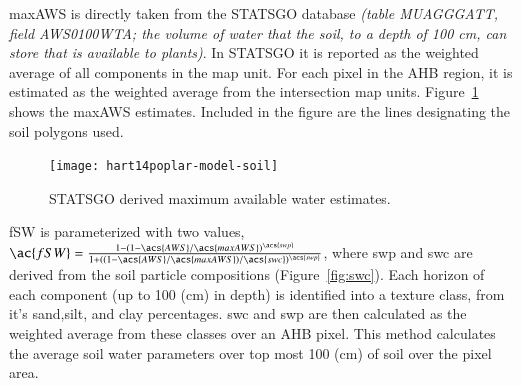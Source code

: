 \documentclass[preprint,12pt]{elsarticle}
\begin{document}
\ac{maxAWS} is directly taken from the \ac{STATSGO} database
\textit{(table MUAGGGATT, field AWS0100WTA; the volume of water that
  the soil, to a depth of 100 cm, can store that is available to
  plants)}. In \ac{STATSGO} it is reported as the weighted average of
all components in the map unit.  For each pixel in the \ac{AHB}
region, it is estimated as the weighted average from the intersection
map units.  Figure~\ref{fig:aws} shows the \ac{maxAWS} estimates.
Included in the figure are the lines designating the soil polygons
used.

\begin{figure}
  \centering
  \texttt{[image: hart14poplar-model-soil]}    
  \caption{\ac{STATSGO} derived maximum available water estimates. }
  \label{fig:aws}
\end{figure}

\ac{fSW} is parameterized with two values, $\ac{fSW} =
\frac{1-(1-\acs{AWS}/\acs{maxAWS})^{\acs{swp}}}
{1+((1-\acs{AWS}/\acs{maxAWS})/\acs{swc})^{\acs{swp}}}$, where
\acf{swp} and \acf{swc} are derived from the soil particle
compositions (Figure~\ref{fig:swc}).  Each horizon of each component
(up to 100 (cm) in depth) is identified into a texture class, from
it's sand,silt, and clay percentages.  \ac{swc} and \ac{swp} are then
calculated as the weighted average from these classes over an \ac{AHB}
pixel.  This method calculates the average soil water parameters over
top most 100 (cm) of soil over the pixel area.
\end{document}
